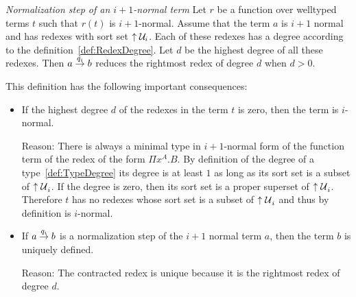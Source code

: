 \begin{definition}
    \label{def:NormalizationStep}
    \emph{Normalization step of an $i+1$-normal term}
    Let $r$ be a function over welltyped terms $t$ such that $r(t)$ is
    $i+1$-normal. Assume that the term $a$ is $i+1$ normal and has redexes with
    sort set ${\uparrow {\cal U}_i}$. Each of these redexes has a degree according to
    the definition~\ref{def:RedexDegree}. Let $d$ be the highest degree of all
    these redexes. Then $a \stackrel{q_i}{\to} b$ reduces the rightmost redex of degree
    $d$ when $d > 0$.

    This definition has the following important consequences:
    \begin{itemize}
        \item
            If the highest degree $d$ of the redexes in the term $t$ is zero,
            then the term is $i$-normal.

            Reason: There is always a minimal type in $i+1$-normal form of the
            function term of the redex of the form $\Pi x^A. B$. By definition
            of the degree of a type~\ref{def:TypeDegree} its degree is at least
            $1$ as long as its sort set is a subset of ${\uparrow {\cal U}}_i$. If the
            degree is zero, then its sort set is a proper superset of ${\uparrow {\cal U}}_i$. Therefore $t$ has no redexes whose sort set is a subset of
            ${\uparrow {\cal U}}_i$ and thus by definition is $i$-normal.

        \item
            If $a \stackrel{q_i}{\to} b$ is a normalization step of the $i+1$ normal
            term $a$, then the term $b$ is uniquely defined.

            Reason: The contracted redex is unique because it is the rightmost
            redex of degree $d$.
    \end{itemize}
\end{definition}


